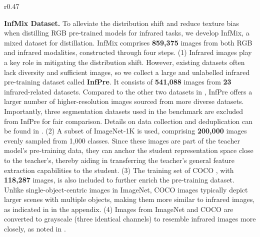 \begin{wraptable}{r}{0.47\textwidth}
    \vspace{-3.5mm}
    \centering
    \caption{Comparisons of infrared pre-training datasets. \#Subset denotes the number of datasets from which the images are collected.}
    \label{tab:dataset_comparison}
    \vspace{1mm}
    \scriptsize
    \vspace{-3.5mm}
\end{wraptable}

\textbf{InfMix Dataset.} To alleviate the distribution shift and reduce texture bias when distilling RGB pre-trained models for infrared tasks, we develop InfMix, a mixed dataset for distillation. InfMix comprises \textbf{859,375} images from both RGB and infrared modalities, constructed through four steps. (1) Infrared images play a key role in mitigating the distribution shift. However, existing datasets often lack diversity and sufficient images, so we collect a large and unlabelled infrared pre-training dataset called \textbf{InfPre}. It consists of \textbf{541,088} images from \textbf{23} infrared-related datasets. Compared to the other two datasets in , InfPre offers a larger number of higher-resolution images sourced from more diverse datasets. Importantly, three segmentation datasets used in the benchmark are excluded from InfPre for fair comparison. Details on data collection and deduplication can be found in . (2) A subset of ImageNet-1K \citep{imagenet} is used, comprising \textbf{200,000} images evenly sampled from 1,000 classes. Since these images are part of the teacher model's pre-training data, they can anchor the student representation space close to the teacher's, thereby aiding in transferring the teacher's general feature extraction capabilities to the student. (3) The training set of COCO \citep{coco}, with \textbf{118,287} images, is also included to further enrich the pre-training dataset. Unlike single-object-centric images in ImageNet, COCO images typically depict larger scenes with multiple objects, making them more similar to infrared images, as indicated in  in the appendix. (4) Images from ImageNet and COCO are converted to grayscale (three identical channels) to resemble infrared images more closely, as noted in .

